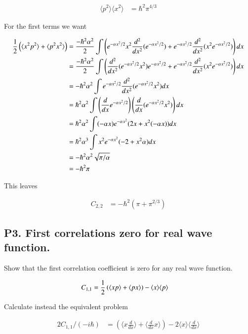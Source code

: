 \documentclass{article}
\newcommand{\expectation}[1]{\langle{#1}\rangle}
\begin{document}
\begin{align*}
\expectation{p^2} \expectation{x^2} &= \hbar^2 \pi^{4/3}
\end{align*}

For the first terms we want

\begin{align*}
\inv{2} \left( \expectation{x^2 p^2} + \expectation{p^2 x^2} \right)
&=
\frac{-\hbar^2 \alpha^2}{2} \int \left( 
e^{-\alpha x^2/2} x^2 \frac{d^2}{dx^2} (e^{-\alpha x^2/2} )
+ e^{-\alpha x^2/2} \frac{d^2}{dx^2} ( x^2 e^{-\alpha x^2/2} ) \right) dx \\
&=
\frac{-\hbar^2 \alpha^2}{2} \int \left( 
 \frac{d^2}{dx^2} ( e^{-\alpha x^2/2} x^2 ) e^{-\alpha x^2/2} 
+ e^{-\alpha x^2/2} \frac{d^2}{dx^2} ( x^2 e^{-\alpha x^2/2} ) \right) dx \\
&=
{-\hbar^2 \alpha^2} \int e^{-\alpha x^2/2} \frac{d^2}{dx^2} ( e^{-\alpha x^2/2} x^2 ) dx \\
&=
{\hbar^2 \alpha^2} \int \left( \frac{d}{dx} e^{-\alpha x^2/2} \right) \left( \frac{d}{dx} ( e^{-\alpha x^2/2} x^2 ) \right) dx \\
&=
{\hbar^2 \alpha^2} \int (-\alpha x) e^{-\alpha x^2} (2x + x^2(-\alpha x)) dx \\
&=
{\hbar^2 \alpha^3} \int x^2 e^{-\alpha x^2} (-2 + x^2 \alpha ) dx \\
&=
{-\hbar^2 \alpha^2} \sqrt{\pi/\alpha}  \\
&=
-\hbar^2 \pi
\end{align*}

This leaves 

\begin{align*}
C_{2,2} &=
-\hbar^2 \left( \pi + \pi^{2/3} \right)
\end{align*}

\subsection{ P3. First correlations zero for real wave function. }

Show that the first correlation coefficient is zero for any real wave function.

\begin{align*}
C_{1,1} &= \inv{2}\left( \expectation{x p} + \expectation{p x} \right) - \expectation{x}\expectation{p}
\end{align*}

Calculate instead the equivalent problem

\begin{align*}
2 C_{1,1}/(-i\hbar) &= \left( \expectation{x \frac{d}{dx}} + \expectation{\frac{d}{dx} x} \right) - 2 \expectation{x}\expectation{\frac{d}{dx}}
\end{align*}
\end{document}
